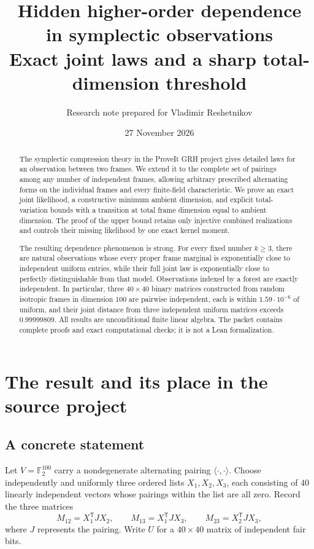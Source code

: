 \documentclass[11pt,letterpaper]{article}
\title{\textbf{Hidden higher-order dependence\\in symplectic observations}\\[6pt]
\large Exact joint laws and a sharp total-dimension threshold}
\author{Research note prepared for Vladimir Reshetnikov}
\date{27 November 2026}
\theoremstyle{definition}
\theoremstyle{remark}
\newcommand{\F}{\mathbb F}
\begin{document}
\maketitle
\begin{abstract}
The symplectic compression theory in the ProveIt GRH project gives detailed laws for an observation between two frames. We extend it to the complete set of pairings among any number of independent frames, allowing arbitrary prescribed alternating forms on the individual frames and every finite-field characteristic. We prove an exact joint likelihood, a constructive minimum ambient dimension, and explicit total-variation bounds with a transition at total frame dimension equal to ambient dimension. The proof of the upper bound retains only injective combined realizations and controls their missing likelihood by one exact kernel moment.

The resulting dependence phenomenon is strong. For every fixed number $k\ge3$, there are natural observations whose every proper frame marginal is exponentially close to independent uniform entries, while their full joint law is exponentially close to perfectly distinguishable from that model. Observations indexed by a forest are exactly independent. In particular, three $40\times40$ binary matrices constructed from random isotropic frames in dimension $100$ are pairwise independent, each is within $1.59\cdot10^{-6}$ of uniform, and their joint distance from three independent uniform matrices exceeds $0.99999809$. All results are unconditional finite linear algebra. The packet contains complete proofs and exact computational checks; it is not a Lean formalization.
\end{abstract}

\section{The result and its place in the source project}

\subsection{A concrete statement}

Let $V=\F_2^{100}$ carry a nondegenerate alternating pairing $\langle\cdot,\cdot\rangle$. Choose independently and uniformly three ordered lists $X_1,X_2,X_3$, each consisting of $40$ linearly independent vectors whose pairings within the list are all zero. Record the three matrices
\[
 M_{12}=X_1^{\mathsf T}JX_2,\qquad
 M_{13}=X_1^{\mathsf T}JX_3,\qquad
 M_{23}=X_2^{\mathsf T}JX_3,
\]
where $J$ represents the pairing. Write $U$ for a $40\times40$ matrix of independent fair bits.
\end{document}
